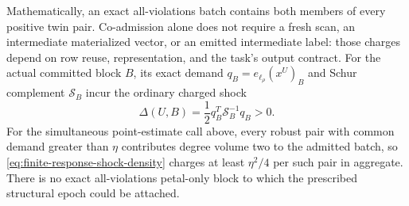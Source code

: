 \begin{remark}
Mathematically, an exact all-violations batch contains both members of every
positive twin pair.  Co-admission alone does not require a fresh scan, an
intermediate materialized vector, or an emitted intermediate label: those
charges depend on row reuse, representation, and the task's output contract.
For the actual committed block $B$, its exact demand
$q_B=e_{\ell_\rho}(x^U)_B$ and Schur complement $\mathcal S_B$ incur the
ordinary charged shock
\begin{equation*}
 \Delta(U,B)=\frac12q_B^T\mathcal S_B^{-1}q_B>0.
\end{equation*}
For the simultaneous point-estimate call above, every robust pair with common
demand greater than $\eta$ contributes degree volume two to the admitted
batch, so
\cref{eq:finite-response-shock-density} charges at least $\eta^2/4$ per such
pair in aggregate.  There is no exact all-violations petal-only block to which
the prescribed structural epoch could be attached.
\end{remark}

